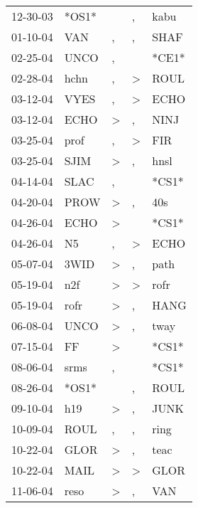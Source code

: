 \begin{supertabular}{lllll}
 12-30-03 &  *OS1* &                  &                , &   kabu \\
 01-10-04 &    VAN &                , &                , &   SHAF \\
 02-25-04 &   UNCO &                , &                  &  *CE1* \\
 02-28-04 &   hchn &                , &     \textgreater &   ROUL \\
 03-12-04 &   VYES &                , &     \textgreater &   ECHO \\
 03-12-04 &   ECHO &     \textgreater &                , &   NINJ \\
 03-25-04 &   prof &                , &     \textgreater &    FIR \\
 03-25-04 &   SJIM &     \textgreater &                , &   hnsl \\
 04-14-04 &   SLAC &                , &                  &  *CS1* \\
 04-20-04 &   PROW &     \textgreater &                , &    40s \\
 04-26-04 &   ECHO &     \textgreater &                  &  *CS1* \\
 04-26-04 &     N5 &                , &     \textgreater &   ECHO \\
 05-07-04 &   3WID &     \textgreater &                , &   path \\
 05-19-04 &    n2f &     \textgreater &     \textgreater &   rofr \\
 05-19-04 &   rofr &     \textgreater &                , &   HANG \\
 06-08-04 &   UNCO &     \textgreater &                , &   tway \\
 07-15-04 &     FF &     \textgreater &                  &  *CS1* \\
 08-06-04 &   srms &                , &                  &  *CS1* \\
 08-26-04 &  *OS1* &                  &                , &   ROUL \\
 09-10-04 &    h19 &     \textgreater &                , &   JUNK \\
 10-09-04 &   ROUL &                , &                , &   ring \\
 10-22-04 &   GLOR &     \textgreater &                , &   teac \\
 10-22-04 &   MAIL &     \textgreater &     \textgreater &   GLOR \\
 11-06-04 &   reso &     \textgreater &                , &    VAN \\

\end{supertabular}
